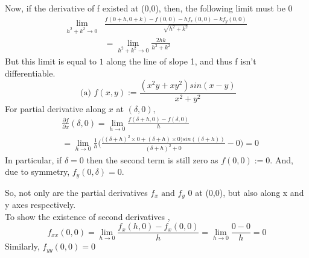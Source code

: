 \documentclass[20pt,a4paper]{extarticle} %
\theoremstyle{definition}
\theoremstyle{definition}
\begin{document}
Now, if the derivative of f existed at (0,0), then, the following limit must be 0
\begin{equation*}
	\begin{split}
		\lim_{h^2+k^2 \to 0}&\frac{f(0+h,0+k)-f(0,0) -hf_x(0,0)-kf_y(0,0)
		}{\sqrt{h^2+k^2}} \\
		&=\lim_{h^2+k^2 \to 0} \frac{2hk}{h^2+k^2}
	\end{split}
\end{equation*}
But this limit is equal to $1$ along the line of slope 1, and thus f isn't differentiable.
\newpage
\[ \text{ (a) } f(x,y):=\frac{(x^2y+xy^2)sin(x-y)}{x^2+y^2}\]
For partial derivative along $x$ at $(\delta,0),$
\begin{equation*}
	\begin{split}
		&\frac{\partial f}{\partial x}(\delta,0) =\lim_{h \to 0} \frac{f(\delta +h,0)-f(\delta,0)}{h}	\\
	&=\lim_{h \to 0} \frac{1}{h} \big(
		\frac{\big( (\delta+h)^2 \times 0 + (\delta+h) \times 0 \big) sin((\delta+h))}
								{(\delta+h)^2+0}
							- 0\big)=0
	\end{split}
\end{equation*}
In particular, if $\delta=0$ then the second term is still zero as $f(0,0):=0$.
And, due to symmetry, $f_y(0,\delta)=0$.

So, not only are the partial derivatives $f_x \text{ and } f_y$ 0 at (0,0), but also along x and y
axes respectively.\\
To show the existence of second derivatives ,
\begin{equation*}
	f_{xx}(0,0) = \lim_{h \to 0} \frac{f_x(h,0)-f_x(0,0)}{h}=\lim_{h \to 0} \frac{0-0}{h}=0
\end{equation*}
Similarly, $f_{yy}(0,0)=0$
\end{document}
